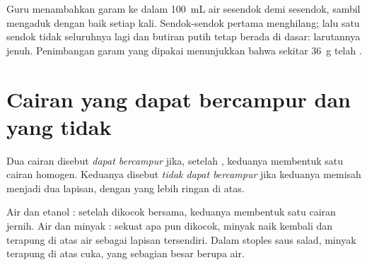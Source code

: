 \begin{inthelab}
Guru menambahkan garam ke dalam \qty{100}{mL} air sesendok demi
sesendok, sambil mengaduk dengan baik setiap kali. Sendok-sendok
pertama menghilang; lalu satu sendok tidak  seluruhnya lagi dan
butiran putih tetap berada di dasar: larutannya jenuh. Penimbangan
garam yang dipakai menunjukkan bahwa sekitar \qty{36}{g} telah .
\end{inthelab}

\section{Cairan yang dapat bercampur dan yang tidak}

\begin{definition}\label{def:g6:solutions-and-solubility:miscible}
Dua cairan disebut \emph{dapat bercampur} jika,
setelah , keduanya membentuk satu cairan homogen. Keduanya
disebut \emph{tidak dapat bercampur} jika
keduanya memisah menjadi dua lapisan, dengan yang lebih ringan di atas.
\end{definition}

\begin{example}\label{ex:g6:solutions-and-solubility:liquids}
Air dan etanol : setelah dikocok bersama, keduanya
membentuk satu cairan jernih. Air dan minyak :
sekuat apa pun dikocok, minyak naik kembali dan terapung di atas air
sebagai lapisan tersendiri. Dalam stoples saus salad, minyak terapung di
atas cuka, yang sebagian besar berupa air.
\end{example}

